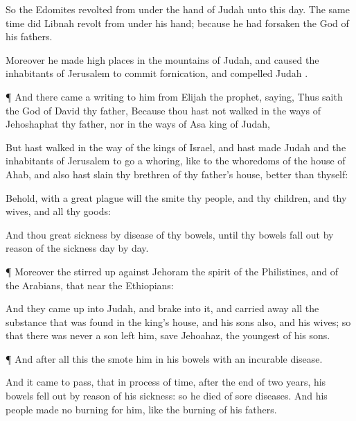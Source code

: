 {So the
Edomites
revolted from under the
hand of
Judah unto this
day. The same
time
{} did
Libnah
revolt from under his
hand; because he had
forsaken the
{}
God of his
fathers.

Moreover he
made high
places in the
mountains of
Judah, and caused the
inhabitants of
Jerusalem to commit
fornication, and
compelled
Judah
{}.


\par }{\PP {}¶ And there
came a
writing to him from
Elijah the
prophet,
saying, Thus
saith the
{}
God of
David thy
father, Because thou hast not
walked in the
ways of
Jehoshaphat thy
father, nor in the
ways of
Asa
king of
Judah,

But hast
walked in the
way of the
kings of
Israel, and hast made
Judah and the
inhabitants of
Jerusalem to go a
whoring, like to the
whoredoms of the
house of
Ahab, and also hast
slain thy
brethren of thy
father’s
house,
{}
better than thyself:

Behold, with a
great
plague will the
{}
smite thy
people, and thy
children, and thy
wives, and all thy
goods:

And thou
{}
great
sickness by
disease of thy
bowels, until thy
bowels fall
out by reason of the
sickness
day by
day.


\par }{\PP {}¶ Moreover the
{} stirred
up against
Jehoram the
spirit of the
Philistines, and of the
Arabians, that
{}
near the
Ethiopians:

And they came
up into
Judah, and
brake into it, and carried
away all the
substance that was
found in the
king’s
house, and his
sons also, and his
wives; so that there was never a
son
left him, save
Jehoahaz, the
youngest of his
sons.


\par }{\PP {}¶ And
after all this the
{}
smote him in his
bowels with an
incurable
disease.

And it came to pass, that in process of
time,
after the
end of
two
years, his
bowels fell
out by
reason of his
sickness: so he
died of
sore
diseases. And his
people
made no
burning for him, like the
burning of his
fathers.

}
